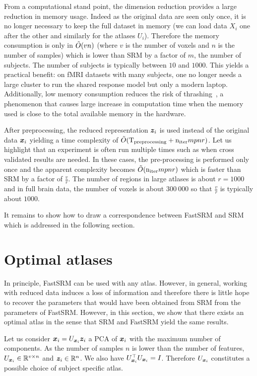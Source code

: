 From a computational stand point, the dimension reduction provides
a large reduction in memory usage. Indeed as the original data are seen only
once, it is no longer necessary to keep the full dataset in memory (we can load
data $X_i$ one after the other and similarly for the atlases $U_i$). Therefore
the memory consumption is only in $\tilde{O}(vn)$ (where $v$ is the number of voxels
and $n$ is the number of samples) which is lower than SRM by a factor of $m$,
the number of subjects. The number of subjects is typically between $10$ and
$1000$. This yields a practical benefit: on fMRI datasets with many subjects, one no longer needs a large cluster to run the shared response model but only a modern laptop.
Additionally, low memory consumption reduces the
risk of thrashing~\cite{denning1968thrashing}, a phenomenon that causes large
increase in computation time when the memory used is close to the total available
memory in the hardware.

After preprocessing, the reduced representation $\boldsymbol{z}_i$ is used instead of the
original data $\boldsymbol{x}_i$ yielding a time complexity of $\tilde{O}(
\mathrm{T_{preprocessing}} + \mathrm{n_{iter}} mpnr)$.
Let us highlight that an experiment is often run
multiple times such as when cross validated results are needed. In these cases,
the pre-processing is performed only once and the apparent complexity becomes
$\tilde{O}(\mathrm{n_{iter}} mpnr)$ which is faster than SRM by
a factor of $\frac{v}{r}$. The number of regions in large atlases is about $r=1000$ and in full brain data, the number of voxels is about $300~000$ so that $\frac{v}{r}$ is typically about $1000$.

It remains to show how to draw a correspondence between FastSRM and SRM which is addressed in the following section.

\section{Optimal atlases}
In principle, FastSRM can be used with any atlas. 
However, in general, working with reduced data induces a loss of information and
therefore there is little hope to recover the parameters that would have been obtained from SRM from the parameters of FastSRM.
However, in this section, we show that there exists an optimal atlas in the sense that SRM and FastSRM yield the same results.

Let us consider $\boldsymbol{x}_i = U_{\boldsymbol{x}_i} \boldsymbol{z}_i$ a PCA of $\boldsymbol{x}_i$ with the maximum
number of components. As the number of
samples $n$ is lower than the number of features, $U_{\boldsymbol{x}_i} \in \mathbb{R}^{v \times n}$ and $\boldsymbol{z}_i \in \mathbb{R}^{n}$.  We also have $U_{\boldsymbol{x}_i}^{\top}U_{\boldsymbol{x}_i} = I$.
Therefore $U_{\boldsymbol{x}_i}$ constitutes a possible choice of subject specific atlas.

